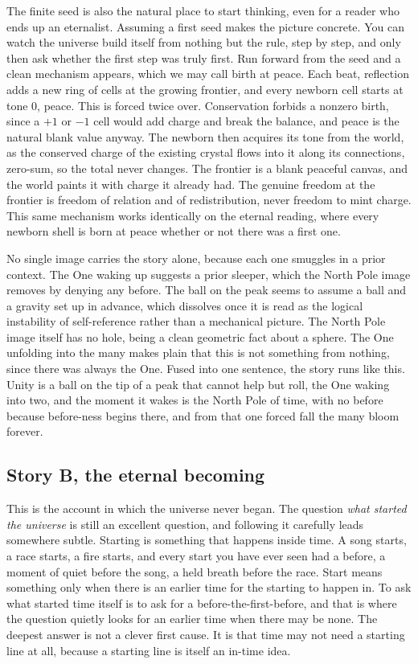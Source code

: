 The finite seed is also the natural place to start thinking, even for a reader who ends up an eternalist. Assuming
a first seed makes the picture concrete. You can watch the universe build itself from nothing but the rule, step
by step, and only then ask whether the first step was truly first. Run forward from the seed and a clean mechanism
appears, which we may call birth at peace. Each beat, reflection adds a new ring of cells at the growing frontier,
and every newborn cell starts at tone $0$, peace. This is forced twice over. Conservation forbids a nonzero birth,
since a $+1$ or $-1$ cell would add charge and break the balance, and peace is the natural blank value anyway. The
newborn then acquires its tone from the world, as the conserved charge of the existing crystal flows into it along
its connections, zero-sum, so the total never changes. The frontier is a blank peaceful canvas, and the world
paints it with charge it already had. The genuine freedom at the frontier is freedom of relation and of
redistribution, never freedom to mint charge. This same mechanism works identically on the eternal reading, where
every newborn shell is born at peace whether or not there was a first one.

No single image carries the story alone, because each one smuggles in a prior context. The One waking up suggests
a prior sleeper, which the North Pole image removes by denying any before. The ball on the peak seems to assume a
ball and a gravity set up in advance, which dissolves once it is read as the logical instability of
self-reference rather than a mechanical picture. The North Pole image itself has no hole, being a clean geometric
fact about a sphere. The One unfolding into the many makes plain that this is not something from nothing, since
there was always the One. Fused into one sentence, the story runs like this. Unity is a ball on the tip of a peak
that cannot help but roll, the One waking into two, and the moment it wakes is the North Pole of time, with no
before because before-ness begins there, and from that one forced fall the many bloom forever.

\subsection{Story B, the eternal becoming}

This is the account in which the universe never began. The question \emph{what started the universe} is still an
excellent question, and following it carefully leads somewhere subtle. Starting is something that happens inside
time. A song starts, a race starts, a fire starts, and every start you have ever seen had a before, a moment of
quiet before the song, a held breath before the race. Start means something only when there is an earlier time for
the starting to happen in. To ask what started time itself is to ask for a before-the-first-before, and that is
where the question quietly looks for an earlier time when there may be none. The deepest answer is not a clever
first cause. It is that time may not need a starting line at all, because a starting line is itself an in-time
idea.


